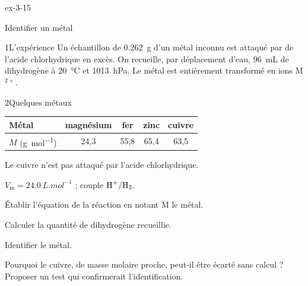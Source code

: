 \begin{blocLivre}{ex-3-15}
\begin{exercice}[3]{Identifier un métal}
\begin{docu}{1}{L'expérience}
Un échantillon de \qty{0,262}{g} d'un métal inconnu est attaqué par de l'acide chlorhydrique en excès. On recueille, par
déplacement d'eau, \qty{96}{mL} de dihydrogène à \qty{20}{\degreeCelsius} et \qty{1013}{hPa}. Le métal est entièrement transformé en ions M$^{2+}$.
\end{docu}
\begin{docu}{2}{Quelques métaux}
\par\smallskip\noindent\hfill\begin{tabular}{lcccc}
\toprule
Métal & magnésium & fer & zinc & cuivre \\
\midrule
$M$ (\unit{g.mol^{-1}}) & 24,3 & 55,8 & 65,4 & 63,5 \\
\bottomrule
\end{tabular}\hfill\null\par\smallskip
Le cuivre n'est pas attaqué par l'acide chlorhydrique.
\end{docu}
\begin{donnees}
$V_\mathrm{m}=\qty{24,0}{L.mol^{-1}}$ ; couple $\ce{H+}/\ce{H2}$.
\end{donnees}
\begin{questions}
\item Établir l'équation de la réaction en notant M le métal.
\item Calculer la quantité de dihydrogène recueillie.
\item \initiative Identifier le métal.
\item Pourquoi le cuivre, de masse molaire proche, peut-il être écarté sans calcul ? Proposer un test qui confirmerait
l'identification.
\end{questions}
\end{exercice}
\end{blocLivre}
